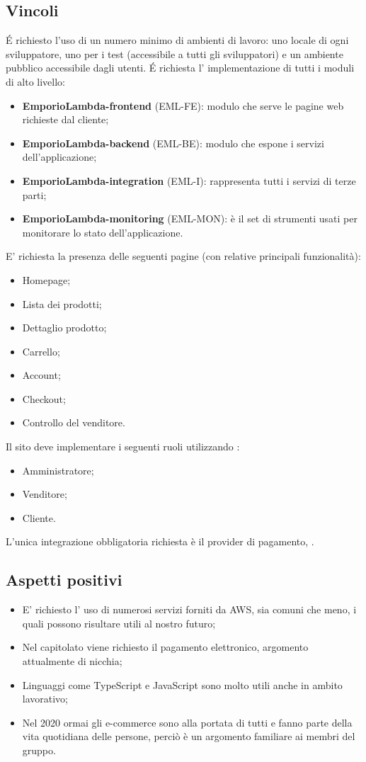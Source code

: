 \subsection{Vincoli}
\'E richiesto l'uso di un numero minimo di ambienti di lavoro: uno locale di ogni sviluppatore, uno per i test (accessibile a tutti gli sviluppatori) e un ambiente pubblico accessibile dagli utenti.
\'E richiesta l' implementazione di tutti i moduli di alto livello:
\begin{itemize}
\item	\textbf{EmporioLambda-frontend} (EML-FE): modulo che serve le pagine web richieste dal cliente;
\item	\textbf{EmporioLambda-backend} (EML-BE): modulo che espone i servizi dell'applicazione;
\item	\textbf{EmporioLambda-integration} (EML-I): rappresenta tutti i servizi di terze parti;
\item	 \textbf{EmporioLambda-monitoring} (EML-MON): è il set di strumenti usati per monitorare lo stato dell'applicazione.
\end{itemize}
E' richiesta la presenza delle seguenti pagine (con relative principali funzionalità):
\begin{itemize}
\item	Homepage;
\item	Lista dei prodotti;
\item	Dettaglio prodotto;
\item	Carrello;
\item	Account;
\item	Checkout;
\item	Controllo del venditore.
\end{itemize}
Il sito deve implementare i seguenti ruoli utilizzando :
\begin{itemize}
\item	Amministratore;
\item	Venditore;
\item	Cliente.
\end{itemize}
L'unica integrazione obbligatoria richiesta è il provider di pagamento, .
\subsection{Aspetti positivi}
\begin{itemize}
\item	E' richiesto l' uso di numerosi servizi forniti da AWS, sia comuni che meno, i quali possono risultare utili al nostro futuro;
\item	Nel capitolato viene richiesto il pagamento elettronico, argomento attualmente di nicchia;
\item	Linguaggi come TypeScript e JavaScript sono molto utili anche in ambito lavorativo;
\item	Nel 2020 ormai gli e-commerce sono alla portata di tutti e fanno parte della vita quotidiana delle persone, perciò è un argomento familiare ai membri del gruppo.
\end{itemize}
